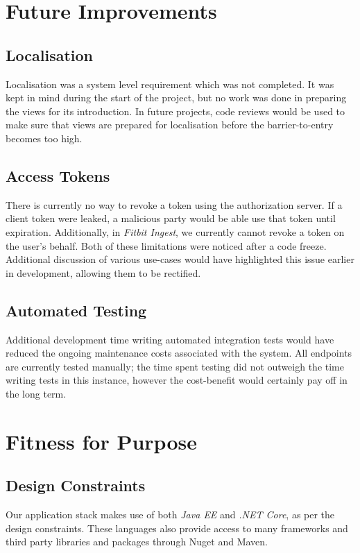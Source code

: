 \section{Future Improvements}

  \subsection{Localisation}
  \par
  Localisation was a system level requirement which was not completed. It was kept in mind during the start of the project, but no work was done in preparing the views for its introduction. In future projects, code reviews would be used to make sure that views are prepared for localisation before the barrier-to-entry becomes too high.

  \subsection{Access Tokens}
  There is currently no way to revoke a token using the authorization server. If a client token were leaked, a malicious party would be able use that token until expiration. Additionally, in \textit{Fitbit Ingest}, we currently cannot revoke a token on the user's behalf. Both of these limitations were noticed after a code freeze. Additional discussion of various use-cases would have highlighted this issue earlier in development, allowing them to be rectified.

  \subsection{Automated Testing}
  \par
  Additional development time writing automated integration tests would have reduced the ongoing maintenance costs associated with the system. All endpoints are currently tested manually; the time spent testing did not outweigh the time writing tests in this instance, however the cost-benefit would certainly pay off in the long term.

\section{Fitness for Purpose}
  \subsection{Design Constraints}
  \par
  Our application stack makes use of both \textit{Java EE} and \textit{.NET Core}, as per the design constraints. These languages also provide access to many frameworks and third party libraries and packages through Nuget and Maven.

